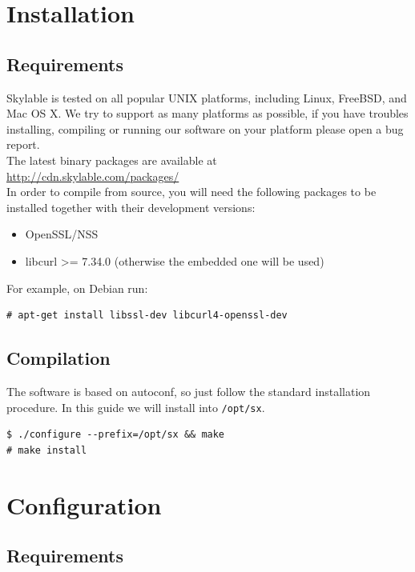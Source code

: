 \chapter{Installation}

\section*{Requirements}

Skylable \SX is tested on all popular UNIX platforms, including Linux,
FreeBSD, and Mac OS X. We try to support as many platforms as possible,
if you have troubles installing, compiling or running our software on
your platform please open a bug report.\\

The latest binary packages are available at\\
\url{http://cdn.skylable.com/packages/}\\

In order to compile \SX from source, you
will need the following packages to be installed together with their
development versions:
\begin{itemize}
    \item OpenSSL/NSS
    \item libcurl >= 7.34.0 (otherwise the embedded one will be used)
\end{itemize}
For example, on Debian run:
\small
\begin{lstlisting}
# apt-get install libssl-dev libcurl4-openssl-dev
\end{lstlisting}
\LARGE

\section*{Compilation}

The software is based on autoconf, so just follow the standard installation
procedure. In this guide we will install \SX into \verb+/opt/sx+.
\small
\begin{lstlisting}
$ ./configure --prefix=/opt/sx && make
# make install
\end{lstlisting}
\LARGE


\chapter{Configuration}

\section*{Requirements}

